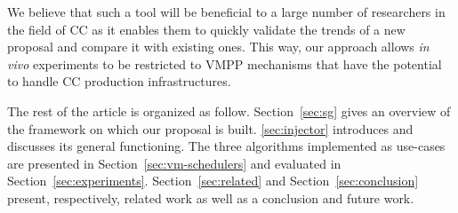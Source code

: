 We believe that such a
tool will be beneficial to a large number of researchers in the field
of CC as it enables them to quickly validate
the trends of a new proposal and compare it with existing
ones.
This way, our approach allows \textit{in vivo} experiments to be
restricted to VMPP mechanisms that have the potential to handle CC
production infrastructures.

The rest of the article is
organized as follow.
Section~\ref{sec:sg} gives an overview of the \sg
framework on which our proposal is built. \ref{sec:injector}
introduces \vmps and discusses its general functioning. The three
algorithms implemented as use-cases are presented in
Section~\ref{sec:vm-schedulers} and evaluated in
Section~\ref{sec:experiments}. Section~\ref{sec:related} and
Section~\ref{sec:conclusion} present, respectively, related work as
well as a conclusion and future work.
